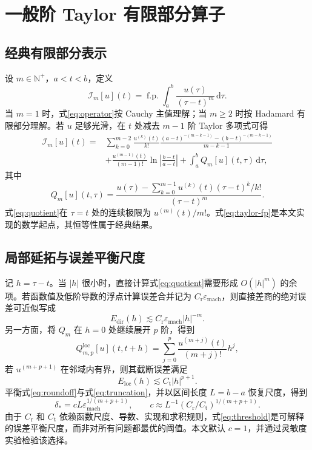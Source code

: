 \documentclass[UTF8,fontset=none,10.5pt,a4paper]{ctexart}
\numberwithin{equation}{section}
\newcommand{\fp}{\operatorname{f.p.}}
\newcommand{\dd}{\,\mathrm d}
\newcommand{\eps}{\varepsilon_{\mathrm{mach}}}
\begin{document}
\section{一般阶 Taylor 有限部分算子}

\subsection{经典有限部分表示}

设 $m\in\mathbb N^+$，$a<t<b$，定义
\begin{equation}
\mathcal I_m[u](t)=\fp\!\int_a^b\frac{u(\tau)}{(\tau-t)^m}\dd\tau .
\label{eq:operator}
\end{equation}
当 $m=1$ 时，式\eqref{eq:operator}按 Cauchy 主值理解；当 $m\ge2$ 时按 Hadamard 有限部分理解。若 $u$ 足够光滑，在 $t$ 处减去 $m-1$ 阶 Taylor 多项式可得
\begin{align}
\mathcal I_m[u](t)={}&
\sum_{k=0}^{m-2}\frac{u^{(k)}(t)}{k!}
\frac{(a-t)^{-(m-k-1)}-(b-t)^{-(m-k-1)}}{m-k-1}
\nonumber\\
&+\frac{u^{(m-1)}(t)}{(m-1)!}
\ln\left|\frac{b-t}{a-t}\right|
+\int_a^b Q_m[u](t,\tau)\dd\tau ,
\label{eq:taylor-fp}
\end{align}
其中
\begin{equation}
Q_m[u](t,\tau)=
\frac{u(\tau)-\displaystyle\sum_{k=0}^{m-1}
u^{(k)}(t)(\tau-t)^k/k!}{(\tau-t)^m} .
\label{eq:quotient}
\end{equation}
式\eqref{eq:quotient}在 $\tau=t$ 处的连续极限为 $u^{(m)}(t)/m!$。式\eqref{eq:taylor-fp}是本文实现的数学起点，其恒等性属于经典结果。

\subsection{局部延拓与误差平衡尺度}

记 $h=\tau-t$。当 $|h|$ 很小时，直接计算式\eqref{eq:quotient}需要形成 $O(|h|^m)$ 的余项。若函数值及低阶导数的浮点计算误差合并记为 $C_{\mathrm r}\eps$，则直接差商的绝对误差可近似写成
\begin{equation}
E_{\mathrm{dir}}(h)\lesssim C_{\mathrm r}\eps |h|^{-m}.
\label{eq:roundoff}
\end{equation}
另一方面，将 $Q_m$ 在 $h=0$ 处继续展开 $p$ 阶，得到
\begin{equation}
Q_{m,p}^{\mathrm{loc}}[u](t,t+h)=
\sum_{j=0}^{p}\frac{u^{(m+j)}(t)}{(m+j)!}h^j,
\label{eq:continuation}
\end{equation}
若 $u^{(m+p+1)}$ 在邻域内有界，则其截断误差满足
\begin{equation}
E_{\mathrm{loc}}(h)\lesssim C_{\mathrm t}|h|^{p+1}.
\label{eq:truncation}
\end{equation}
平衡式\eqref{eq:roundoff}与式\eqref{eq:truncation}，并以区间长度 $L=b-a$ 恢复尺度，得到
\begin{equation}
\delta_*=cL\eps^{1/(m+p+1)},
\qquad
c\approx L^{-1}(C_{\mathrm r}/C_{\mathrm t})^{1/(m+p+1)}.
\label{eq:threshold}
\end{equation}
由于 $C_{\mathrm r}$ 和 $C_{\mathrm t}$ 依赖函数尺度、导数、实现和求积规则，式\eqref{eq:threshold}是可解释的误差平衡尺度，而非对所有问题都最优的阈值。本文默认 $c=1$，并通过灵敏度实验检验该选择。
\end{document}
